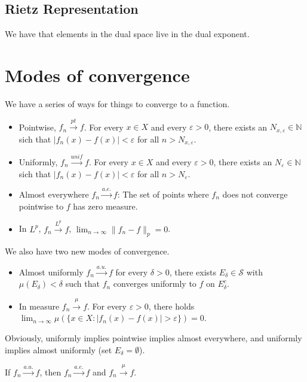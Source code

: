 \documentclass{article}
\theoremstyle{definition}
\numberwithin{theorem}{section}
\numberwithin{equation}{section}
\begin{document}
\subsection{Rietz Representation}
We have that elements in the dual space live in the dual exponent. 

\section{Modes of convergence}
We have a series of ways for things to converge to a function.

\begin{itemize}
	\item Pointwise, $f_n \xrightarrow{pt} f$. For every $x \in X$ and every $\varepsilon > 0$, there exists an $N_{x,\varepsilon} \in \mathbb{N}$ sich that $|f_n(x) - f(x) | < \varepsilon$ for all $n > N_{x,\varepsilon}$. 
	\item Uniformly, $f_n \xrightarrow{unif} f$. For every $x \in X$ and every $\varepsilon > 0$, there exists an $N_{\varepsilon} \in \mathbb{N}$ sich that $|f_n(x) - f(x) | < \varepsilon$ for all $n > N_{ \varepsilon}$. 
	\item Almost everywhere $f_n \xrightarrow{a.e.} f$: The set of points where $f_n$ does not converge pointwise to $f$ has zero measure.
	\item In $L^p$, $f_n \xrightarrow{L^p} f$, $\lim_{n \rightarrow \infty} \| f_n  - f \|_p = 0$. 
\end{itemize}
	We also have two new modes of convergence. 
\begin{itemize}
	\item Almost uniformly $f_n \xrightarrow{a.u.} f$ for every $\delta > 0$, there exists $E_\delta \in \mathcal{S}$ with $\mu(E_\delta) < \delta$ such that $f_n$ converges uniformly to $f$ on $E^c_\delta$. 
	\item In measure $f_n \xrightarrow{\mu} f$. For every $\varepsilon > 0$, there holds $\lim_{n \rightarrow \infty} \mu(\{x \in X : |f_n(x) - f(x)| > \varepsilon\}) = 0$.
\end{itemize}

Obviously, uniformly implies pointwise implies almost everywhere, and uniformly implies almost uniformly (set $E_\delta = \emptyset$).

If $f_n \xrightarrow{a.u.} f$, then $f_n \xrightarrow{a.e.} f$ and $f_n \xrightarrow{\mu} f$.
\end{document}
